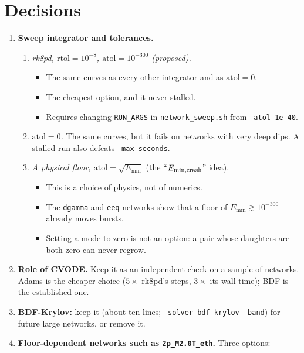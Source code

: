 \documentclass[10pt,a4paper]{article}
\newcommand{\atol}{\mathrm{atol}}
\newcommand{\rtol}{\mathrm{rtol}}
\begin{document}
\section{Decisions}\label{sec:decisions}
\begin{enumerate}
    \item \textbf{Sweep integrator and tolerances.}
        \begin{enumerate}
            \item[(a)] \emph{rk8pd, $\rtol=10^{-8}$, $\atol=10^{-300}$ (proposed).}
                \begin{itemize}
                    \item The same curves as every other integrator and as $\atol=0$.
                    \item The cheapest option, and it never stalled.
                    \item Requires changing \texttt{RUN\_ARGS} in \texttt{network\_sweep.sh} from \texttt{--atol 1e-40}.
                \end{itemize}
            \item[(b)] \emph{$\atol=0$.} The same curves, but it fails on networks with very deep dips. A stalled run also defeats \texttt{--max-seconds}.
            \item[(c)] \emph{A physical floor, $\atol=\sqrt{E_{\min}}$} (the ``$E_{\rm min,crash}$'' idea).
                \begin{itemize}
                    \item This is a choice of physics, not of numerics.
                    \item The \texttt{dgamma} and \texttt{eeq} networks show that a floor of $E_{\min}\gtrsim10^{-300}$ already moves bursts.
                    \item Setting a mode to zero is not an option: a pair whose daughters are both zero can never regrow.
                \end{itemize}
        \end{enumerate}
    \item \textbf{Role of CVODE.} Keep it as an independent check on a sample of networks. Adams is the cheaper choice ($5\times$ rk8pd's steps, $3\times$ its wall time); BDF is the established one.
    \item \textbf{BDF-Krylov:} keep it (about ten lines; \texttt{--solver bdf-krylov --band}) for future large networks, or remove it.
    \item \textbf{Floor-dependent networks such as \texttt{2p\_M2.0T\_eth}.} Three options:

\end{enumerate}
\end{document}
